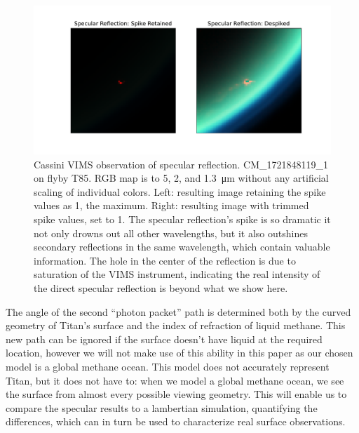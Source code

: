 \documentclass{article}
\begin{document}
\begin{figure}[htb]
\includegraphics[scale = 0.5]{SpecSpikeNoSpike.pdf}
\centering
\caption{Cassini VIMS observation of specular reflection. CM\_1721848119\_1 on flyby T85. RGB map is to 5, 2, and \qty{1.3}{\micro\meter} without any artificial scaling of individual colors. Left: resulting image retaining the spike values as 1, the maximum. Right: resulting image with trimmed spike values, set to 1. The specular reflection's spike is so dramatic it not only drowns out all other wavelengths, but it also outshines secondary reflections in the same wavelength, which contain valuable information. The hole in the center of the reflection is due to saturation of the VIMS instrument, indicating the real intensity of the direct specular reflection is beyond what we show here.}
\label{fig:3}
\end{figure}

The angle of the second ``photon packet'' path is determined both by the curved geometry of Titan's surface and the index of refraction of liquid methane. This new path can be ignored if the surface doesn't have liquid at the required location, however we will not make use of this ability in this paper as our chosen model is a global methane ocean. This model does not accurately represent Titan, but it does not have to: when we model a global methane ocean, we see the surface from almost every possible viewing geometry. This will enable us to compare the specular results to a lambertian simulation, quantifying the differences, which can in turn be used to characterize real surface observations. 
\end{document}

